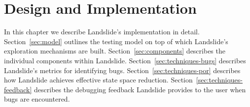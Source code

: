 \chapter{Design and Implementation}
\label{sec:design}

In this chapter we describe Landslide's implementation in detail. Section~\ref{sec:model} outlines the testing model on top of which Landslide's exploration mechanisms are built. Section~\ref{sec:components} describes the individual components within Landslide. Section~\ref{sec:techniques-bugs} describes Landslide's metrics for identifying bugs. Section~\ref{sec:techniques-por} describes how Landslide achieves effective state space reduction. Section~\ref{sec:techniques-feedback} describes the debugging feedback Landslide provides to the user when bugs are encountered.

